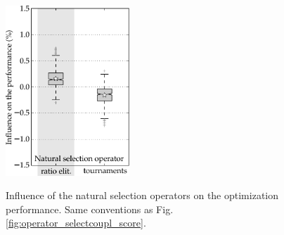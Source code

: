 \documentclass{ametsoc}
\begin{document}
\begin{figure}[t]
	\begin{center}
		\noindent\includegraphics[width=11pc,angle=0]{fig11.pdf}\\
	\end{center}
	\caption{Influence of the natural selection operators on the optimization performance. Same conventions as Fig. \ref{fig:operator_selectcoupl_score}.}
	\label{fig:operator_selectnat_score}
\end{figure}
\end{document}
